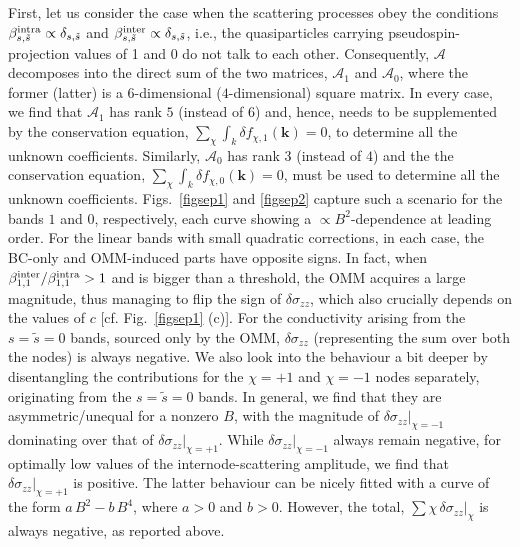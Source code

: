 \documentclass[aps,prb,onecolumn,nofootinbib,citeautoscript,10pt]{revtex4-2}
\begin{document}
First, let us consider the case when the scattering processes obey the conditions $ \beta^{\rm intra}_{s, \tilde s}  \propto \delta_{s, \tilde s}$ and $ \beta^{\rm inter}_{s, \tilde s} \propto \delta_{s, \tilde s}$, i.e., the quasiparticles carrying pseudospin-projection values of 1 and 0 do not talk to each other. Consequently, $ \mathcal A $ decomposes into the direct sum of the two matrices,
$ \mathcal{A}_1 $ and $ \mathcal{A}_0 $, where the former (latter) is a $6$-dimensional ($4$-dimensional) square matrix. In every case, we find that $ \mathcal{A}_1 $ has rank $5$ (instead of $6$) and, hence, needs to be supplemented by the conservation equation, $\sum _{\chi}	\int_k  \delta f_{\chi, 1} (\boldsymbol {k}) = 0$, to determine all the unknown coefficients. Similarly, $ \mathcal{A}_0 $ has rank $3$ (instead of $4$) and the the conservation equation, $\sum _{\chi}	\int_k  \delta f_{\chi, 0} (\boldsymbol {k}) = 0$, must be used to determine all the unknown coefficients. Figs.~\ref{figsep1} and \ref{figsep2} capture such a scenario for the bands $1$ and $0$, respectively, each curve showing a $\propto B^2$-dependence at leading order. For the linear bands with small quadratic corrections, in each case, the BC-only and OMM-induced parts have opposite signs. In fact, when $ \beta^{\rm inter}_{1,1} / \beta^{\rm intra}_{1,1} > 1$ and is bigger than a threshold, the OMM acquires a large magnitude, thus managing to flip the sign of $\delta \sigma_{zz}$, which also crucially depends on the values of $c$ [cf. Fig.~\ref{figsep1} (c)]. For the conductivity arising from the $s = \tilde s = 0$ bands, sourced only by the OMM, $\delta \sigma_{zz}$ (representing the sum over both the nodes) is always negative. We also look into the behaviour a bit deeper by disentangling the contributions for the $\chi =+1$ and $\chi =-1$ nodes separately, originating from the  $s = \tilde s = 0$ bands. In general, we find that they are asymmetric/unequal for a nonzero $B$, with the magnitude of $\delta \sigma_{zz} \vert_{\chi= -1}$ dominating over that of $\delta \sigma_{zz} \vert_{\chi= + 1}$. While $\delta \sigma_{zz} \vert_{\chi= -1}$ always remain negative, for optimally low values of the internode-scattering amplitude, we find that $\delta \sigma_{zz} \vert_{\chi= + 1}$ is positive. The latter behaviour can be nicely fitted with a curve of the form $ a \, B^2 - b \, B^4$, where $a>0$ and $b>0 $. However, the total, $ \sum \chi \,\delta \sigma_{zz} \vert_{\chi} $ is always negative, as reported above.
 
\end{document}

